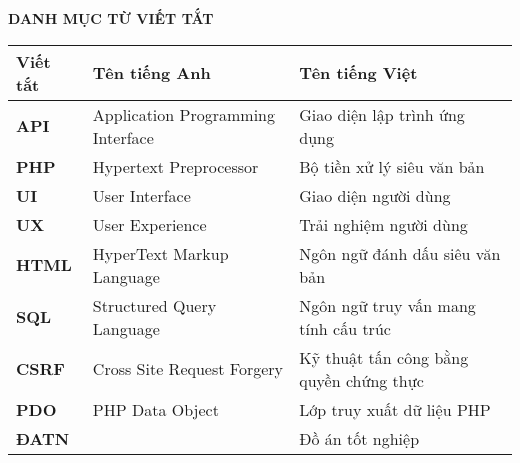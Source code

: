 \documentclass[../DoAn.tex]{subfiles}
\begin{document}
\begin{center}
    \Large{\textbf{DANH MỤC TỪ VIẾT TẮT}}\\
\end{center}
\begin{longtable}{l p{6.5cm} p{6cm}}
	\hline
   \textbf{Viết tắt}  & \textbf{Tên tiếng Anh}	& \textbf{Tên tiếng Việt} \\ \hline 
	\textbf{API} & Application Programming Interface & Giao diện lập trình ứng dụng\\
	\textbf{PHP} & Hypertext Preprocessor & Bộ tiền xử lý siêu văn bản\\
	\textbf{UI} & User Interface & Giao diện người dùng\\
    \textbf{UX} & User Experience & Trải nghiệm người dùng\\
	\textbf{HTML} & HyperText Markup Language & Ngôn ngữ đánh dấu siêu văn bản\\
	\textbf{SQL }  & Structured Query Language  & Ngôn ngữ truy vấn mang tính cấu trúc\\
    \textbf{CSRF} & Cross Site Request Forgery & Kỹ thuật tấn công bằng quyền chứng thực\\
    \textbf{PDO }  & PHP Data Object  & Lớp truy xuất dữ liệu PHP\\
	\textbf{ĐATN} &  & Đồ án tốt nghiệp \\

    \hline
\end{longtable}
\end{document}
